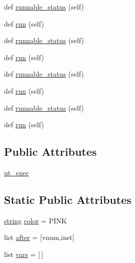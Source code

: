 \begin{DoxyCompactItemize}
\item 
def \hyperlink{classwaflib_1_1_tools_1_1waf__unit__test_1_1utest_aedc8f18c36eee11263ba8378b6e53b4f}{runnable\+\_\+status} (self)
\item 
def \hyperlink{classwaflib_1_1_tools_1_1waf__unit__test_1_1utest_aa278751a79cbc141887ef1bfbaca56f2}{run} (self)
\item 
def \hyperlink{classwaflib_1_1_tools_1_1waf__unit__test_1_1utest_aedc8f18c36eee11263ba8378b6e53b4f}{runnable\+\_\+status} (self)
\item 
def \hyperlink{classwaflib_1_1_tools_1_1waf__unit__test_1_1utest_aa278751a79cbc141887ef1bfbaca56f2}{run} (self)
\item 
def \hyperlink{classwaflib_1_1_tools_1_1waf__unit__test_1_1utest_aedc8f18c36eee11263ba8378b6e53b4f}{runnable\+\_\+status} (self)
\item 
def \hyperlink{classwaflib_1_1_tools_1_1waf__unit__test_1_1utest_aa278751a79cbc141887ef1bfbaca56f2}{run} (self)
\item 
def \hyperlink{classwaflib_1_1_tools_1_1waf__unit__test_1_1utest_aedc8f18c36eee11263ba8378b6e53b4f}{runnable\+\_\+status} (self)
\item 
def \hyperlink{classwaflib_1_1_tools_1_1waf__unit__test_1_1utest_aa278751a79cbc141887ef1bfbaca56f2}{run} (self)
\end{DoxyCompactItemize}
\subsection*{Public Attributes}
\begin{DoxyCompactItemize}
\item 
\hyperlink{classwaflib_1_1_tools_1_1waf__unit__test_1_1utest_a02118a14fb6e8080bee1855382c914ca}{ut\+\_\+exec}
\end{DoxyCompactItemize}
\subsection*{Static Public Attributes}
\begin{DoxyCompactItemize}
\item 
\hyperlink{test__lib_f_l_a_c_2format_8c_ab02026ad0de9fb6c1b4233deb0a00c75}{string} \hyperlink{classwaflib_1_1_tools_1_1waf__unit__test_1_1utest_ac592b3cd2ce31be64016a97bd2593fdd}{color} = \textquotesingle{}P\+I\+NK\textquotesingle{}
\item 
list \hyperlink{classwaflib_1_1_tools_1_1waf__unit__test_1_1utest_a0f16856a87ef0ae70ebb899e5da5538e}{after} = \mbox{[}\textquotesingle{}vnum\textquotesingle{},\textquotesingle{}inst\textquotesingle{}\mbox{]}
\item 
list \hyperlink{classwaflib_1_1_tools_1_1waf__unit__test_1_1utest_a8ffb76563c196007aa00880fef03badd}{vars} = \mbox{[}$\,$\mbox{]}
\end{DoxyCompactItemize}


